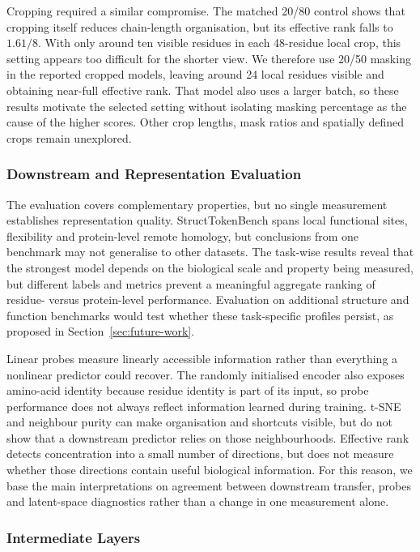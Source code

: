 Cropping required a similar compromise. The matched 20/80 control shows that cropping itself reduces chain-length organisation, but its effective rank falls to $1.61/8$. With only around ten visible residues in each 48-residue local crop, this setting appears too difficult for the shorter view. We therefore use 20/50 masking in the reported cropped models, leaving around 24 local residues visible and obtaining near-full effective rank. That model also uses a larger batch, so these results motivate the selected setting without isolating masking percentage as the cause of the higher scores. Other crop lengths, mask ratios and spatially defined crops remain unexplored.

\subsubsection{Downstream and Representation Evaluation}

The evaluation covers complementary properties, but no single measurement establishes representation quality. StructTokenBench spans local functional sites, flexibility and protein-level remote homology, but conclusions from one benchmark may not generalise to other datasets. The task-wise results reveal that the strongest model depends on the biological scale and property being measured, but different labels and metrics prevent a meaningful aggregate ranking of residue- versus protein-level performance. Evaluation on additional structure and function benchmarks would test whether these task-specific profiles persist, as proposed in Section~\ref{sec:future-work}.

Linear probes measure linearly accessible information rather than everything a nonlinear predictor could recover. The randomly initialised encoder also exposes amino-acid identity because residue identity is part of its input, so probe performance does not always reflect information learned during training. t-SNE and neighbour purity can make organisation and shortcuts visible, but do not show that a downstream predictor relies on those neighbourhoods. Effective rank detects concentration into a small number of directions, but does not measure whether those directions contain useful biological information. For this reason, we base the main interpretations on agreement between downstream transfer, probes and latent-space diagnostics rather than a change in one measurement alone.

\subsubsection{Intermediate Layers}

